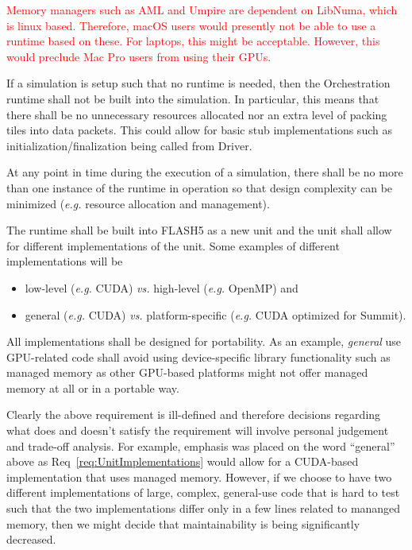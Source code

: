 \documentclass{article}
\begin{document}
\textcolor{red}{Memory managers such as AML and Umpire are dependent on
LibNuma, which is linux based.  Therefore, macOS users would presently not be
able to use a runtime based on these.  For laptops, this might be acceptable.
However, this would preclude Mac Pro users from using their GPUs.}

\begin{req}
If a simulation is setup such that no runtime is needed, then the Orchestration
runtime shall not be built into the simulation.  In particular, this means that
there shall be no unnecessary resources allocated nor an extra level of packing
tiles into data packets.  This could allow for basic stub implementations such
as initialization/finalization being called from Driver.
\end{req}

\begin{req}
At any point in time during the execution of a simulation, there shall be no more
than one instance of the runtime in operation so that design complexity can
be minimized (\textit{e.g.} resource allocation and management).
\end{req}

\begin{req}
\label{req:UnitImplementations}
The runtime shall be built into FLASH5 as a new unit and the unit shall allow
for different implementations of the unit.  Some examples of different
implementations will be
\begin{itemize}
\item{low-level (\textit{e.g.} CUDA) \textit{vs.} high-level
(\textit{e.g.} OpenMP) and}
\item{general (\textit{e.g.} CUDA) \textit{vs.}} platform-specific
(\textit{e.g.} CUDA optimized for Summit).
\end{itemize}
\end{req}

\begin{req}
All implementations shall be designed for portability.  As an example,
\textit{general} use GPU-related code shall avoid using device-specific library
functionality such as managed memory as other GPU-based platforms might not
offer managed memory at all or in a portable way.
\end{req}

Clearly the above requirement is ill-defined and therefore decisions regarding
what does and doesn't satisfy the requirement will involve personal judgement
and trade-off analysis.  For example, emphasis was placed on the word
``general'' above as Req~\ref{req:UnitImplementations} would allow for a
CUDA-based implementation that uses managed memory.  However, if we choose to
have two different implementations of large, complex, general-use code that is
hard to test such that the two implementations differ only in a few lines
related to mananged memory, then we might decide that maintainability is being
significantly decreased.
\end{document}
